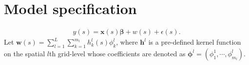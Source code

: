 \documentclass[
12pt, %
a4paper, %
oneside, %
headinclude,footinclude, %
BCOR5mm, %
]{scrartcl}
\begin{document}
%


\section{\textcolor[rgb]{1.00,0.00,0.50}{Model specification}}
\begin{equation}
\begin{aligned}
  y(s) = \boldsymbol{x}(s)\boldsymbol{\beta} + w(s) + \epsilon(s).
\end{aligned} \label{model1}
\end{equation}
Let $\boldsymbol{w}(s) =  \sum_{l = 1}^{L}\sum_{k = 1}^{m_l}{h_k^{l}(s)\phi_k^l}$, where $\boldsymbol{h}^{l}$ is a pre-defined kernel function on the spatial $l$th grid-level  whose coefficients are denoted as $\boldsymbol{\phi}^l = \left(\phi_1^1, \cdots, \phi_{m_l}^l\right)$.
\end{document}

